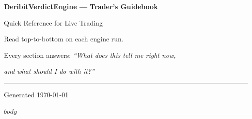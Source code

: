\documentclass[a4paper,11pt]{article}
\begin{document}
\begin{titlepage}
\thispagestyle{empty}
\noindent
\colorbox{tealcolor}{%
  \begin{minipage}[t][7.5cm]{\paperwidth}%
    \vspace*{2.4cm}%
    \hspace{2.5cm}%
    {\fontsize{24}{30}\selectfont\bfseries\color{white}%
      DeribitVerdictEngine --- Trader's Guidebook}%
    \par\vspace{0.5cm}%
    \hspace{2.5cm}%
    {\fontsize{14}{18}\selectfont\color{white!85!tealcolor}%
      Quick Reference for Live Trading}%
    \vfill%
  \end{minipage}%
}%
\par
\vspace*{4.5cm}
\hspace{2.5cm}%
\begin{minipage}{0.7\paperwidth}
  {\fontsize{15}{20}\selectfont\color{darktext}%
    Read top-to-bottom on each engine run.\par
    Every section answers: \textit{``What does this tell me right now,}\par
    \textit{and what should I do with it?''}}%
  \vspace{1.5em}\par
  {\color{tealcolor}\rule{0.4\paperwidth}{1.5pt}}\par
  \vspace{0.8em}
  {\fontsize{11}{15}\selectfont\color{mutedgray}Generated \today}
\end{minipage}
\restoregeometry
\end{titlepage}

\newpage
\thispagestyle{plain}
\setcounter{tocdepth}{2}
\tableofcontents

\newpage
\setcounter{page}{1}

$body$
\end{document}
